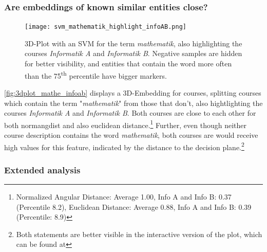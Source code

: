 
\subsubsection{Are embeddings of known similar entities close?}

\begin{figure}[H]
	\centering
	\texttt{[image: svm\_mathematik\_highlight\_infoAB.png]}
	\caption[3D-Plot with an SVM for the term \textit{mathematik}]{
		\label{fig:3dplot_mathe_infoab}
		3D-Plot with an SVM for the term \textit{mathematik}, also highlighting the courses \textit{Informatik A} and \textit{Informatik B}. Negative samples are hidden for better visibility, and entities that contain the word more often than the 75\textsuperscript{th} percentile have bigger markers.
	}
\end{figure}

\autoref{fig:3dplot_mathe_infoab} displays a 3D-Embedding for courses, splitting courses which contain the term "\textit{mathematik}" from those that don't, also hightlighting the courses \textit{Informatik A} and \textit{Informatik B}. Both courses are close to each other for both \gls{normangdist} and also euclidean distance.\footnote{Normalized Angular Distance: Average 1.00, Info A and Info B: 0.37 (Percentile 8.2), Euclidean Distance: Average 0.88, Info A and Info B: 0.39 (Percentile: 8.9)}
Further, even though neither course description contains the word \textit{mathematik}, both courses are would receive high values for this feature, indicated by the distance to the decision plane.\footnote{Both statements are better visible in the interactive version of the plot, which can be found at }

\subsubsection{Extended analysis}



